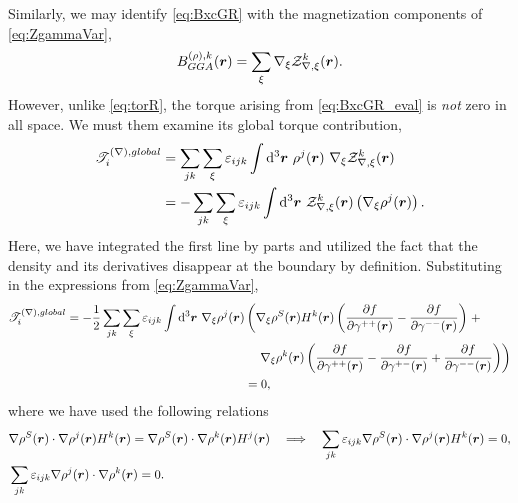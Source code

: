 Similarly, we may identify \cref{eq:BxcGR} with the magnetization components of \cref{eq:ZgammaVar},
\begin{equation}
B^{(\rho),k}_{GGA}(\boldsymbol{r}) = \sum_\xi \nabla_\xi \mathcal{Z}^k_{\nabla,\xi}(\boldsymbol{r}) \label{eq:BxcGR_eval} .
\end{equation}
However, unlike  \cref{eq:torR}, the torque arising from \cref{eq:BxcGR_eval} is \emph{not} zero in all space. We must them examine its global torque contribution,
\begin{align}
  \mathscr{T}_i^{(\nabla), global} 
    &= \sum_{jk} \sum_\xi \varepsilon_{ijk} \int\mathrm{d}^3\boldsymbol{r}\text{   } \rho^j(\boldsymbol{r}) \text{ }\nabla_\xi \mathcal{Z}^k_{\nabla,\xi}(\boldsymbol{r}) \nonumber \\
    &= -\sum_{jk} \sum_\xi \varepsilon_{ijk} \int\mathrm{d}^3\boldsymbol{r}\text{   } \mathcal{Z}^k_{\nabla,\xi}(\boldsymbol{r}) \left(\nabla_\xi \rho^j(\boldsymbol{r})\right) .
\end{align}
Here, we have integrated the first line by parts and utilized the fact that the density and its derivatives disappear at the boundary by definition.
Substituting in the expressions from \cref{eq:ZgammaVar},
\begin{align}
  \mathscr{T}_i^{(\nabla), global} 
    = -\frac{1}{2}\sum_{jk} \sum_\xi \varepsilon_{ijk} \int\mathrm{d}^3\boldsymbol{r}\text{   } 
    \nabla_\xi \rho^j(\boldsymbol{r})
    &\left(
      \nabla_\xi\rho^S(\boldsymbol{r}) H^k(\boldsymbol{r})  \left( \dfrac{\partial f}{\partial \gamma^{++}(\boldsymbol{r})} - \dfrac{\partial f}{\partial \gamma^{--}(\boldsymbol{r})} \right) 
       \right. +\nonumber\\ & \quad \left. \nabla_\xi\rho^k(\boldsymbol{r})
      \left(\dfrac{\partial f}{\partial \gamma^{++}(\boldsymbol{r})} - \dfrac{\partial f}{\partial \gamma^{+-}(\boldsymbol{r})} + \dfrac{\partial f}{\partial \gamma^{--}(\boldsymbol{r})} \right)
    \right) \nonumber \\
    &= 0,
\end{align}
where we have used the following relations
\begin{align}
&\nabla \rho^S(\boldsymbol{r}) \cdot \nabla \rho^j(\boldsymbol{r}) H^k(\boldsymbol{r}) = \nabla \rho^S(\boldsymbol{r}) \cdot \nabla \rho^k (\boldsymbol{r})H^j(\boldsymbol{r})  \quad \Longrightarrow \quad
  \sum_{jk} \varepsilon_{ijk} \nabla \rho^S(\boldsymbol{r}) \cdot \nabla \rho^j(\boldsymbol{r}) H^k(\boldsymbol{r}) = 0, \\
& \sum_{jk}\varepsilon_{ijk} \nabla \rho^j(\boldsymbol{r}) \cdot \nabla \rho^k(\boldsymbol{r}) = 0.
\end{align}
 
